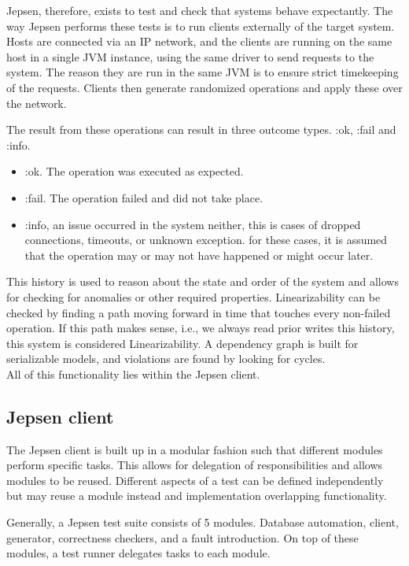 \documentclass[a4paper,10pt,titlepage]{report}
\begin{document}
\vspace{5mm}

Jepsen, therefore, exists to test and check that systems behave expectantly. The way Jepsen performs these tests is to run clients externally of the target system. Hosts are connected via an IP network, and the clients are running on the same host in a single JVM instance, using the same driver to send requests to the system. The reason they are run in the same JVM is to ensure strict timekeeping of the requests. Clients then generate randomized operations and apply these over the network.


\vspace{5mm}
The result from these operations can result in three outcome types. :ok, :fail and :info.
\begin{itemize}
\item :ok. The operation was executed as expected.
\item :fail. The operation failed and did not take place.
\item :info, an issue occurred in the system neither, this is cases of dropped connections, timeouts, or unknown exception. for these cases, it is assumed that the operation may or may not have happened or might occur later.
\end{itemize}
This history is used to reason about the state and order of the system and allows for checking for anomalies or other required properties. Linearizability can be checked by finding a path moving forward in time that touches every non-failed operation. If this path makes sense, i.e., we always read prior writes this history, this system is considered Linearizability. A dependency graph is built for serializable models, and violations are found by looking for cycles. \\

All of this functionality lies within the Jepsen client.

\subsection{Jepsen client}
The Jepsen client is built up in a modular fashion such that different modules perform specific tasks. This allows for delegation of responsibilities and allows modules to be reused. Different aspects of a test can be defined independently but may reuse a module instead and implementation overlapping functionality.

Generally, a Jepsen test suite consists of 5 modules. Database automation, client, generator, correctness checkers, and a fault introduction. On top of these modules, a test runner delegates tasks to each module.
\end{document}
